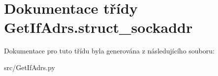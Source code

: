 \hypertarget{classGetIfAdrs_1_1struct__sockaddr}{\section{Dokumentace třídy Get\-If\-Adrs.\-struct\-\_\-sockaddr}
\label{d6/dba/classGetIfAdrs_1_1struct__sockaddr}
}


Dokumentace pro tuto třídu byla generována z následujícího souboru\-:\begin{DoxyCompactItemize}
\item 
src/Get\-If\-Adrs.\-py\end{DoxyCompactItemize}
